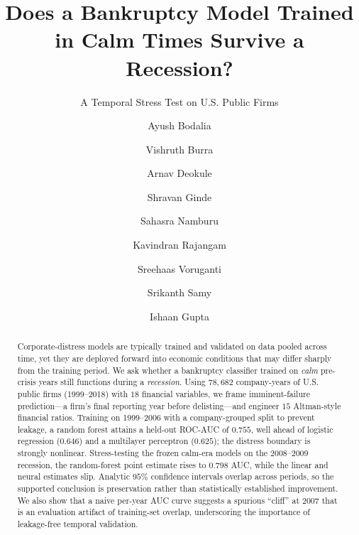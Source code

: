 \documentclass[manuscript,nonacm]{acmart}
\begin{document}
\title{Does a Bankruptcy Model Trained in Calm Times Survive a Recession?}
\subtitle{A Temporal Stress Test on U.S. Public Firms}

\author{Ayush Bodalia}
\equalcontrib
{}

\author{Vishruth Burra}
\equalcontribmark
{}

\author{Arnav Deokule}
\equalcontribmark
{}

\author{Shravan Ginde}
\equalcontribmark
{}

\author{Sahasra Namburu}
\equalcontribmark
{}

\author{Kavindran Rajangam}
\equalcontribmark
{}

\author{Sreehaas Voruganti}
\equalcontribmark
{}

\author{Srikanth Samy}

\author{Ishaan Gupta}

\begin{abstract}
Corporate-distress models are typically trained and validated on data pooled across
time, yet they are deployed forward into economic conditions that may differ sharply
from the training period. We ask whether a bankruptcy classifier trained on \emph{calm}
pre-crisis years still functions during a \emph{recession}. Using $78{,}682$
company-years of U.S. public firms (1999--2018) with $18$ financial variables, we frame
imminent-failure prediction---a firm's final reporting year before delisting---and
engineer $15$ Altman-style financial ratios. Training on 1999--2006 with a
company-grouped split to prevent leakage, a random forest attains a held-out ROC-AUC of
$0.755$, well ahead of logistic regression ($0.646$) and a multilayer perceptron
($0.625$); the distress boundary is strongly nonlinear. Stress-testing the frozen
calm-era models on the 2008--2009 recession, the random-forest point estimate rises to
$0.798$ AUC, while the linear and neural estimates slip. Analytic $95\%$ confidence
intervals overlap across periods, so the supported conclusion is preservation rather
than statistically established improvement. We also show that a naive per-year AUC curve suggests a
spurious ``cliff'' at 2007 that is an evaluation artifact of training-set overlap,
underscoring the importance of leakage-free temporal validation.
\end{abstract}
\end{document}
